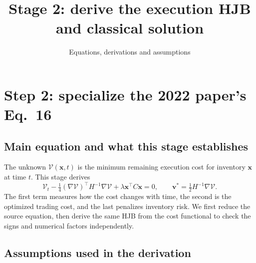 \documentclass[11pt,a4paper]{article}
\title{Stage 2: derive the execution HJB and classical solution}
\author{Equations, derivations and assumptions}
\date{}
\begin{document}
\maketitle
\setcounter{section}{1}
\section{Step 2: specialize the 2022 paper's Eq.~16}
\label{sec:stage2}

\subsection*{Main equation and what this stage establishes}

The unknown $\mathcal V(\mathbf x,t)$ is the minimum remaining execution
cost for inventory $\mathbf x$ at time $t$. This stage derives
\[
 \boxed{\mathcal V_t-\tfrac14(\nabla\mathcal V)^\top H^{-1}\nabla\mathcal V
 +\lambda\mathbf x^\top C\mathbf x=0,\qquad
 \mathbf v^*=\tfrac12H^{-1}\nabla\mathcal V.}
\]
The first term measures how the cost changes with time, the second is
the optimized trading cost, and the last penalizes inventory risk.
We first reduce the source equation, then derive the same HJB from the
cost functional to check the signs and numerical factors independently.

\subsection*{Assumptions used in the derivation}
\end{document}

